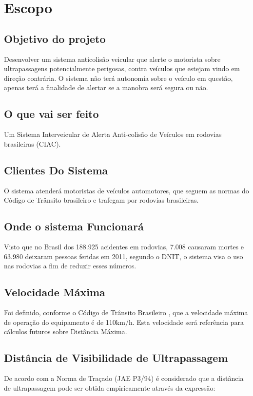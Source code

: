\chapter[Escopo]{Escopo}

\section{Objetivo do projeto}
Desenvolver um sistema anticolisão veicular que alerte o motorista sobre ultrapassagens potencialmente perigosas, contra veículos que estejam vindo em direção contrária.
O sistema não terá autonomia sobre o veículo em questão, apenas terá a finalidade de alertar se a manobra será segura ou não.

\section{O que vai ser feito}
Um Sistema Interveicular de Alerta Anti-colisão de Veículos em rodovias brasileiras (CIAC).

\section{Clientes Do Sistema}
O sistema atenderá motoristas de veículos automotores, que seguem as normas do Código de Trânsito brasileiro e trafegam por rodovias brasileiras.

\section{Onde o sistema Funcionará}
Visto que no Brasil dos 188.925 acidentes em rodovias, 7.008 causaram mortes e 63.980 deixaram pessoas feridas em 2011, segundo o DNIT, o sistema visa o uso nas rodovias a fim de reduzir esses números. \cite{ministerio}

\section{Velocidade Máxima}
Foi definido, conforme o Código de Trânsito Brasileiro \cite{ctb}, que a velocidade máxima de operação do equipamento é de 110km/h.
Esta velocidade será referência para cálculos futuros sobre Distância Máxima.

\section{Distância de Visibilidade de Ultrapassagem}
De acordo com a Norma de Traçado (JAE P3/94) é considerado que a distância  de ultrapassagem pode ser obtida empiricamente através da expressão:

